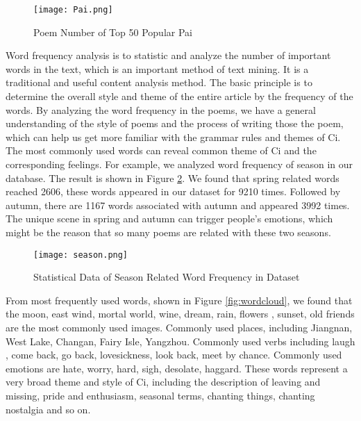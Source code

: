 \begin{figure}[htbp]
	\centering
	\texttt{[image: Pai.png]}
	\caption{Poem Number of Top 50 Popular Pai}
	\label{fig:pai}
\end{figure}
%

Word frequency analysis is to statistic and analyze the number of important words in the text, which is an important method of text mining. It is a traditional and useful content analysis method. The basic principle is to determine the overall style and theme of the entire article by the frequency of the words. By analyzing the word frequency in the poems, we have a general understanding of the style of poems and the process of writing those the poem, which can help us get more familiar with the grammar rules and themes of Ci. The most commonly used words can reveal common theme of Ci and the corresponding feelings. For example, we analyzed word frequency of season in our database. The result is shown in Figure \ref{fig:season}. We found that spring related words reached 2606, these words appeared in our dataset for 9210 times. Followed by autumn, there are 1167 words associated with autumn and appeared 3992 times. The unique scene in spring and autumn can trigger people's emotions, which might be the reason that so many poems are related with these two seasons.
\begin{figure}[htbp]
	\centering
	\texttt{[image: season.png]}
	\caption{Statistical Data of Season Related Word Frequency in Dataset}
	\label{fig:season}
\end{figure}
%
From most frequently used words, shown in Figure \ref{fig:wordcloud}, we found that the moon, east wind, mortal world, wine, dream, rain, flowers , sunset, old friends are the most commonly used images. Commonly used places, including Jiangnan, West Lake, Changan, Fairy Isle, Yangzhou. Commonly used verbs including laugh , come back, go back, lovesickness, look back, meet by chance. Commonly used emotions are hate, worry, hard, sigh, desolate, haggard. These words represent a very broad theme and style of Ci, including the description of leaving and missing, pride and enthusiasm, seasonal terms, chanting things, chanting nostalgia and so on.
%
